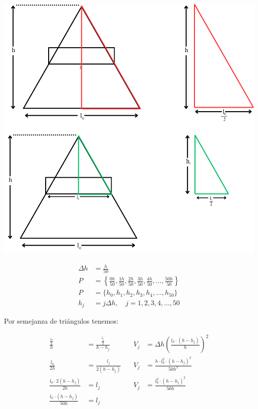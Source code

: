 \documentclass[12pt]{article}
\begin{document}
\begin{enumerate}
        \begin{minipage}{0.4\textwidth}
            \raggedright
            \includegraphics[width=\textwidth]{piramide2.png}
        \end{minipage}%
  
        \hfill
  
        \begin{minipage}{0.55\textwidth}
  
            \begin{align*}
                \Delta h &= \frac{h}{50}\\
                P &= \left\{ \frac{0h}{50}, \frac{1h}{50}, \frac{2h}{50}, \frac{3h}{50}, \frac{4h}{50}, \dots,\frac{50h}{50} \right\}\\
                P &= \{ h_0, h_1, h_2, h_3, h_4, \dots, h_{50} \}\\
                h_j &= j \Delta h, \quad j = 1, 2, 3, 4, \dots, 50
            \end{align*}
  
        \end{minipage}
  
        Por semejanza de triángulos tenemos:
  
        \begin{align*}
            \frac{\frac{l_0}{2}}{h} &= \frac{\frac{l_j}{2}}{h - h_j} &\quad V_j &= \Delta h \left( \frac{l_0 \cdot (h - h_j)}{h} \right)^2\\
            \frac{l_0}{2h} &= \frac{l_j}{2(h - h_j)}&\quad V_j &=   \frac{h \cdot l_0^2 \cdot (h - h_j)^2}{50 h^2} \\
            \frac{l_0 \cdot 2(h - h_j)}{2h} &= l_j&\quad V_j &=   \frac{l_0^2 \cdot (h - h_j)^2}{50 h}\\
            \frac{l_0 \cdot (h - h_j)}{50h} &= l_j
        \end{align*}



\end{enumerate}
\end{document}
